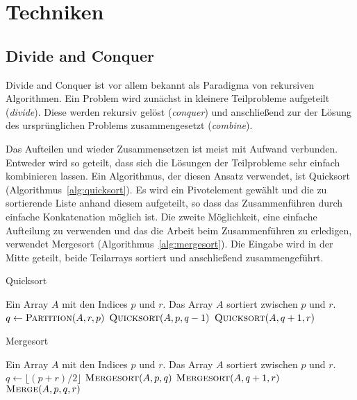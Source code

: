 \section{Techniken}

\subsection{Divide and Conquer}
Divide and Conquer ist vor allem bekannt als Paradigma von rekursiven
Algorithmen.
Ein Problem wird zunächst in kleinere Teilprobleme aufgeteilt (\emph{divide}).
Diese werden rekursiv gelöst (\emph{conquer}) und anschließend zur der Lösung
des ursprünglichen Problems zusammengesetzt (\emph{combine}).

Das Aufteilen und wieder Zusammensetzen ist meist mit Aufwand verbunden.
Entweder wird so geteilt, dass sich die Lösungen der Teilprobleme sehr einfach
kombinieren lassen. Ein Algorithmus, der diesen Ansatz verwendet, ist
Quicksort (Algorithmus~\ref{alg:quicksort}).
Es wird ein Pivotelement gewählt und die zu sortierende Liste anhand diesem
aufgeteilt, so dass das Zusammenführen durch einfache Konkatenation möglich
ist.
Die zweite Möglichkeit, eine einfache Aufteilung zu verwenden und das
die Arbeit beim Zusammenführen zu erledigen, verwendet Mergesort
(Algorithmus~\ref{alg:mergesort}).
Die Eingabe wird in der Mitte geteilt, beide Teilarrays sortiert und
anschließend zusammengeführt.

\begin{algorithm}
    \caption{Quicksort \cite[S.171]{cormen}}
    \label{alg:quicksort}
    \begin{algorithmic}[1]
    \Require Ein Array $A$ mit den Indices $p$ und $r$.
    \Ensure Das Array $A$ sortiert zwischen $p$ und $r$.
        \State $q \gets \textsc{Partition}(A,r,p)$
        \State $\textsc{Quicksort}(A, p, q - 1)$
        \State $\textsc{Quicksort}(A, q + 1, r)$
    \EndIf
    \end{algorithmic}
\end{algorithm}

\begin{algorithm}
    \caption{Mergesort \cite[S.34]{cormen}}
    \label{alg:mergesort}
    \begin{algorithmic}[1]
    \Require Ein Array $A$ mit den Indices $p$ und $r$.
    \Ensure Das Array $A$ sortiert zwischen $p$ und $r$.
        \State $q \gets \lfloor (p + r) / 2 \rfloor$
        \State $\textsc{Mergesort}(A, p, q)$
        \State $\textsc{Mergesort}(A, q + 1, r)$
        \State $\textsc{Merge}(A, p, q, r)$
    \EndIf
    \end{algorithmic}
\end{algorithm}

